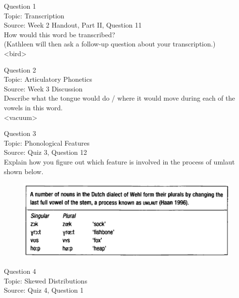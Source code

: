 \documentclass[12pt]{article}
\begin{document}
{\large Question 1}\\

Topic: Transcription\\
Source: Week 2 Handout, Part II, Question 11\\

How would this word be transcribed?\\ (Kathleen will then ask a follow-up question about your transcription.)\\

<bird>


\newpage

{\large Question 2}\\

Topic: Articulatory Phonetics\\
Source: Week 3 Discussion\\

Describe what the tongue would do / where it would move during each of the vowels in this word.\\

<vacuum>


\newpage

{\large Question 3}\\

Topic: Phonological Features\\
Source: Quiz 3, Question 12\\

Explain how you figure out which feature is involved in the process of umlaut shown below.\\

\begin{figure}[H]
\includegraphics{../images/dutch.png}
\end{figure}

\newpage

{\large Question 4}\\

Topic: Skewed Distributions\\
Source: Quiz 4, Question 1\\
\end{document}
